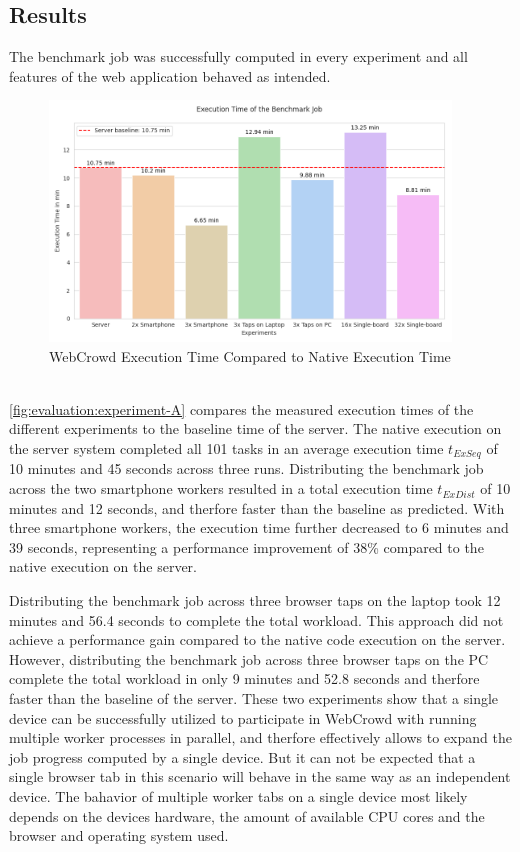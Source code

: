 \subsection{Results}
The benchmark job was successfully computed in every experiment and all features of the web application behaved as intended.
\newpage
\begin{figure}[htbp]
    \centering
    \includegraphics[width=0.95\textwidth]{gfx/figures/Evaluation_A.png}
    \caption{WebCrowd Execution Time Compared to Native Execution Time}
    \label{fig:evaluation:experiment-A}
\end{figure}
~\\
\autoref{fig:evaluation:experiment-A} compares the measured execution times of the different experiments to the baseline time of the server. The native execution on the server system completed all 101 tasks in an average execution time $t_{ExSeq}$ of 10 minutes and 45 seconds across three runs. Distributing the benchmark job across the two smartphone workers resulted in a total execution time $t_{ExDist}$ of 10 minutes and 12 seconds, and therfore faster than the baseline as predicted. With three smartphone workers, the execution time further decreased to 6 minutes and 39 seconds, representing a performance improvement of 38\% compared to the native execution on the server. 

Distributing the benchmark job across three browser taps on the laptop took 12 minutes and 56.4 seconds to complete the total workload. This approach did not achieve a performance gain compared to the native code execution on the server. However, distributing the benchmark job across three browser taps on the \acs{PC} complete the total workload in only 9 minutes and 52.8 seconds and therfore faster than the baseline of the server. These two experiments show that a single device can be successfully utilized to participate in WebCrowd with running multiple worker processes in parallel, and therfore effectively allows to expand the job progress computed by a single device. But it can not be expected that a single browser tab in this scenario will behave in the same way as an independent device. The bahavior of multiple worker tabs on a single device most likely depends on the devices hardware, the amount of available \acs{CPU} cores and the browser and operating system used.

